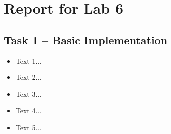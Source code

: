 \documentclass[a4paper, DIV12, headsepline]{scrartcl}
\begin{document}
\section*{Report for Lab 6}
\subsection*{Task 1 -- Basic Implementation}
\begin{itemize}
\item Text 1...

\item Text 2...

\item Text 3...

\item Text 4...

\item Text 5...

\end{itemize}
\end{document}
